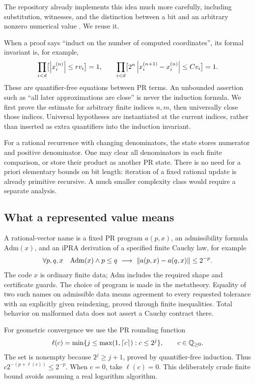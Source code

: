 The repository already implements this idea much more carefully, including substitution, witnesses, and the distinction between a bit and an arbitrary nonzero numerical value \cite{repo-fiber}. We reuse it.

When a proof says ``induct on the number of computed coordinates'', its formal invariant is, for example,
\[
 \prod_{i<d}\bigl[\left|x_i^{(n)}\right|\le r v_i\bigr]=1,
 \qquad
 \prod_{i<d}\bigl[2^n\left|x_i^{(n+1)}-x_i^{(n)}\right|\le C v_i\bigr]=1.
\]
These are quantifier-free equations between PR terms. An unbounded assertion such as ``all later approximations are close'' is never the induction formula. We first prove the estimate for arbitrary finite indices \(n,m\), then universally close those indices. Universal hypotheses are instantiated at the current indices, rather than inserted as extra quantifiers into the induction invariant.

For a rational recurrence with changing denominators, the state stores numerator and positive denominator. One may clear all denominators in each finite comparison, or store their product as another PR state. There is no need for a priori elementary bounds on bit length: iteration of a fixed rational update is already primitive recursive. A much smaller complexity class would require a separate analysis.

\subsection{What a represented value means}

\begin{definition}\label{def:name}
A rational-vector name is a fixed PR program \(a(p,x)\), an admissibility formula \(\mathrm{Adm}(x)\), and an iPRA derivation of a specified finite Cauchy law, for example
\[
 \forall p,q,x\quad \mathrm{Adm}(x)\wedge p\le q\ \longrightarrow\
 \left\lVert a(p,x)-a(q,x)\right\rVert\le 2^{-p}.
\]
The code \(x\) is ordinary finite data; \(\mathrm{Adm}\) includes the required shape and certificate guards. The choice of program is made in the metatheory. Equality of two such names on admissible data means agreement to every requested tolerance with an explicitly given reindexing, proved through finite inequalities. Total behavior on malformed data does not assert a Cauchy contract there.
\end{definition}

For geometric convergence we use the PR rounding function
\[
 \ell(c)=\min\{j\le \max(1,\lceil c\rceil):c\le2^j\},\qquad c\in\mathbb Q_{\ge0}.
\]
The set is nonempty because \(2^j\ge j+1\), proved by quantifier-free induction. Thus \(c2^{-(p+\ell(c))}\le2^{-p}\). When \(c=0\), take \(\ell(c)=0\). This deliberately crude finite bound avoids assuming a real logarithm algorithm.

